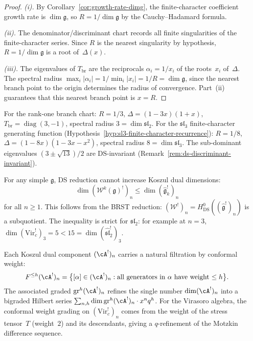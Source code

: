 \begin{proof}
\emph{(i).}
By Corollary~\ref{cor:growth-rate-dimg}, the finite-character
coefficient growth rate is $\dim\mathfrak{g}$, so
$R = 1/\dim\mathfrak{g}$ by the
Cauchy--Hadamard formula.

\emph{(ii).}
The denominator/discriminant chart records all finite singularities of
the finite-character series.  Since $R$ is the nearest singularity by
hypothesis, $R=1/\dim\mathfrak{g}$ is a root of~$\Delta(x)$.

\emph{(iii).}
The eigenvalues of $T_{\mathrm{br}}$ are the reciprocals
$\alpha_i = 1/x_i$ of the roots~$x_i$ of~$\Delta$.
The spectral radius $\max_i |\alpha_i| = 1/\min_i |x_i| = 1/R
= \dim\mathfrak{g}$, since the nearest branch point to the origin
determines the radius of convergence. Part~(ii) guarantees that
this nearest branch point is $x = R$.
\end{proof}

\begin{remark}\label{rem:dominant-branch-verified}
For the rank-one branch chart: $R = 1/3$,
$\Delta = (1 - 3x)(1+x)$,
$T_{\mathrm{br}} = \operatorname{diag}(3, -1)$, spectral radius $3
= \dim\mathfrak{sl}_2$.
For the $\mathfrak{sl}_3$ finite-character generating function
(Hypothesis~\ref{hyp:sl3-finite-character-recurrence}): $R = 1/8$,
$\Delta = (1 - 8x)(1 - 3x - x^2)$, spectral radius $8
= \dim\mathfrak{sl}_3$. The sub-dominant eigenvalues
$(3 \pm \sqrt{13})/2$ are DS-invariant
(Remark~\ref{rem:ds-discriminant-invariant}).
\end{remark}

\begin{remark}\label{rem:ds-dimension-inequality}
For any simple $\mathfrak{g}$, DS reduction cannot increase Koszul dual dimensions:
\[
\dim (\mathcal{W}^k(\mathfrak{g})^!)_n \leq \dim (\widehat{\mathfrak{g}}_k^!)_n
\]
for all $n \geq 1$. This follows from the BRST reduction: $(\mathcal{W}^!)_n = H^0_{\mathrm{DS}}((\widehat{\mathfrak{g}}^!)_n)$ is a subquotient. The inequality is strict for $\mathfrak{sl}_2$: for example at $n = 3$, $\dim (\mathrm{Vir}_c^!)_3 = 5 < 15 = \dim (\widehat{\mathfrak{sl}}_2^!)_3$.
\end{remark}

\begin{remark}\label{rem:conformal-weight-filtration}
Each Koszul dual component $(\cA^!)_n$ carries a natural filtration by conformal weight:
\[
F^{\leq h} (\cA^!)_n = \bigl\{[\alpha] \in (\cA^!)_n :
\text{all generators in $\alpha$ have weight $\leq h$}\bigr\}.
\]
The associated graded $\operatorname{gr}^h (\cA^!)_n$ refines the single number
$\dim (\cA^!)_n$ into a bigraded Hilbert series
$\sum_{n,h} \dim \operatorname{gr}^h (\cA^!)_n \cdot x^n q^h$.
For the Virasoro algebra, the conformal weight grading on
$(\mathrm{Vir}_c^!)_n$ comes from the weight of the stress tensor~$T$
(weight~$2$) and its descendants, giving a $q$-refinement of the
Motzkin difference sequence.
\end{remark}

